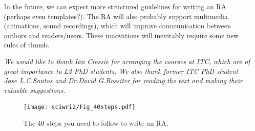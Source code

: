 \documentclass[graybox,envcountchap,sectrefs,UStrade]{svmono}
\begin{document}
In the future, we can expect more structured guidelines for writing an RA (perhaps even templates?). The RA will also probably support multimedia (animations, sound recordings), which will improve communication between authors and readers/users. These innovations will inevitably require some new rules of thumb.\par


\bigskip

\emph{We would like to thank Ian Cressie for arranging the courses at ITC, which are of great importance to L2 PhD students. We also thank former ITC PhD student Jose L.C.\@ Santos and Dr.\@ David G.\@ Rossiter for reading the text and making their valuable suggestions.}

\begin{figure}[!htp]
\begin{center}
\texttt{[image: sciwri2/Fig\_40steps.pdf]}
\caption{The 40 steps you need to follow to write an RA.} \label{Fig:40steps}
\end{center}
\end{figure}




{\small  }


\printindex
\end{document}
